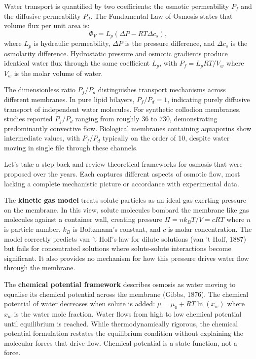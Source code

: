 Water transport is quantified by two coefficients: the osmotic permeability $P_f$ and the diffusive permeability $P_d$. The Fundamental Law of Osmosis states that volume flux per unit area is:
\[
\Phi_V = L_p(\Delta P - RT\Delta c_s),
\]
where $L_p$ is hydraulic permeability, $\Delta P$ is the pressure difference, and $\Delta c_s$ is the osmolarity difference. Hydrostatic pressure and osmotic gradients produce identical water flux through the same coefficient $L_p$, with $P_f = L_p RT/V_w$ where $V_w$ is the molar volume of water.

The dimensionless ratio $P_f/P_d$ distinguishes transport mechanisms across different membranes. In pure lipid bilayers, $P_f/P_d = 1$, indicating purely diffusive transport of independent water molecules. For synthetic collodion membranes, studies reported $P_f/P_d$ ranging from roughly 36 to 730, demonstrating predominantly convective flow. Biological membranes containing aquaporins show intermediate values, with $P_f/P_d$ typically on the order of 10, despite water moving in single file through these channels.

Let's take a step back and review theoretical frameworks for osmosis that were proposed over the years. Each captures different aspects of osmotic flow, most lacking a complete mechanistic picture or accordance with experimental data.

The \textbf{kinetic gas model} treats solute particles as an ideal gas exerting pressure on the membrane. In this view, solute molecules bombard the membrane like gas molecules against a container wall, creating pressure $\Pi = nk_B T/V = cRT$ where $n$ is particle number, $k_B$ is Boltzmann's constant, and $c$ is molar concentration. The model correctly predicts van 't Hoff's law for dilute solutions (van 't Hoff, 1887) but fails for concentrated solutions where solute-solute interactions become significant. It also provides no mechanism for how this pressure drives water flow through the membrane.

The \textbf{chemical potential framework} describes osmosis as water moving to equalise its chemical potential across the membrane (Gibbs, 1876). The chemical potential of water decreases when solute is added: $\mu = \mu_0 + RT \ln(x_w)$ where $x_w$ is the water mole fraction. Water flows from high to low chemical potential until equilibrium is reached. While thermodynamically rigorous, the chemical potential formulation restates the equilibrium condition without explaining the molecular forces that drive flow. Chemical potential is a state function, not a force.

